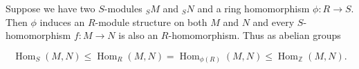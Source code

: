 Suppose we have two $S$-modules $_S M$ and $_S N$ and a ring homomorphism $\phi: R \rightarrow S$. Then $\phi$ induces an $R$-module structure on both $M$ and $N$ and every $S$-homomorphism $f: M \rightarrow N$ is also an $R$-homomorphism. Thus as abelian groups

$$\operatorname{Hom}_S(M, N) \leq \operatorname{Hom}_R(M, N) = \operatorname{Hom}_{\phi(R)}(M, N) \leq \operatorname{Hom}_{\mathbb{Z}}(M, N).$$
